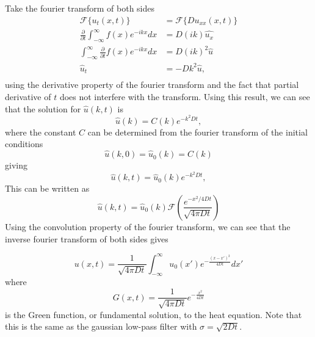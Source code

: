 \documentclass[11pt,a4paper,noindent]{article}
\begin{document}
Take the fourier transform of both sides
\begin{align}
\mathcal{F}\{u_t(x,t)\} &= \mathcal{F}\{D u_{xx}(x,t)\} \\
\frac{\partial}{\partial t} \int_{-\infty}^{\infty} f(x) e^{-ikx} dx &= D (ik) \hat{u_x} \\
 \int_{-\infty}^{\infty} \frac{\partial}{\partial t}f(x) e^{-ikx} dx &= D (ik)^2 \hat{u} \\
\hat{u}_t &= -D k^2 \hat{u}, \\
\end{align}
using the derivative property of the fourier transform and the fact that partial derivative of $t$ does not interfere with the transform. Using this result, we can see that the solution for $\hat{u}(k,t)$ is
\begin{equation}
\hat{u}(k) = C(k) e^{-k^2Dt},
\end{equation}
where the constant $C$ can be determined from the fourier transform of the initial conditions
\begin{equation}
\hat{u}(k,0) = \hat{u}_0(k) = C(k)
\end{equation}
giving
\begin{equation}
\hat{u}(k,t) = \hat{u}_0(k) e^{-k^2Dt},
\end{equation}
This can be written as
\begin{equation}
\hat{u}(k,t) = \hat{u}_0(k) \mathcal{F} \left( \frac{e^{-x^2/4Dt}}{\sqrt{4\pi Dt}} \right)
\end{equation}
Using the convolution property of the fourier transform, we can see that the inverse fourier transform of both sides gives

\begin{equation}
u(x,t) = \frac{1}{\sqrt{4 \pi D t}}  \int_{-\infty}^{\infty} u_0(x') e^{-\frac{(x-x')^2}{4Dt}} dx'
\end{equation}
where
\begin{equation}
G(x,t) = \frac{1}{\sqrt{4 \pi D t}}  e^{-\frac{x^2}{4Dt}}
\end{equation}
is the Green function, or fundamental solution, to the heat equation. Note that this is the same as the gaussian low-pass filter with $\sigma = \sqrt{2Dt}$.
\end{document}
